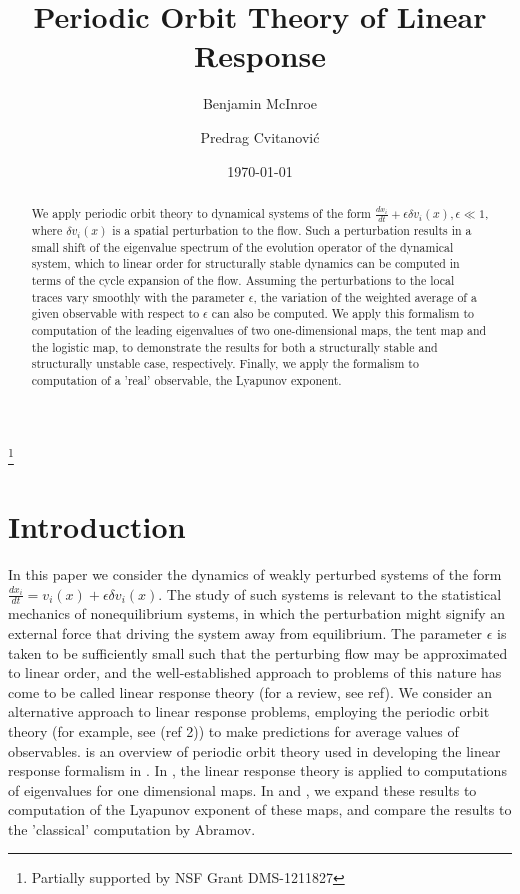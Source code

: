 \documentclass[aps,pre,
                showpacs,
                twocolumn,
                groupedaddress,
                floatfix]{revtex4-1}
\begin{document}
\title{Periodic Orbit Theory of Linear Response}
\author{Benjamin McInroe}
\author{Predrag Cvitanovi\'c}
\thanks{Partially supported by NSF Grant DMS-1211827}

\date{\today}

\begin{abstract}
We apply periodic orbit theory to dynamical systems of
the form $\frac{dx_{i}}{dt}+\epsilon \delta v_{i}(x), \epsilon \ll 1$,
where $\delta v_{i}(x)$ is a spatial perturbation to the flow. Such a
perturbation results in a small shift of the eigenvalue spectrum of the
evolution operator of the dynamical system, which to linear order for
structurally stable dynamics can be computed in terms of the cycle
expansion of the flow. Assuming the perturbations to the local traces
vary smoothly with the parameter $\epsilon$, the variation of the
weighted average of a given observable with respect to $\epsilon$ can
also be computed. We apply this formalism to computation of the leading
eigenvalues of two one-dimensional maps, the tent map and the logistic
map, to demonstrate the results for both a structurally stable and
structurally unstable case, respectively. Finally, we apply the formalism
to computation of a 'real' observable, the Lyapunov exponent.
\end{abstract}

\maketitle



\section{Introduction}
\label{sect:intro}

In this paper we consider the dynamics of weakly perturbed systems of
the form $\frac{dx_{i}}{dt}=v_{i}(x) + \epsilon \delta v_{i}(x)$. The
study of such systems is relevant to the statistical mechanics of
nonequilibrium systems, in which the perturbation might signify an
external force that driving the system away from equilibrium. The
parameter $\epsilon$ is taken to be sufficiently small such that the
perturbing flow may be approximated to linear order, and the
well-established approach to problems of this nature has come to be
called linear response theory (for a review, see ref). We consider an
alternative approach to linear response problems, employing the periodic
orbit theory (for example, see (ref 2)) to make predictions for average
values of observables.   is an overview of periodic orbit
theory used in developing the linear response formalism in
. In , the linear response
theory is applied to computations of eigenvalues for one dimensional
maps. In  and , we expand these
results to computation of the Lyapunov exponent of these maps, and compare
the results to the 'classical' computation by Abramov.
\end{document}

